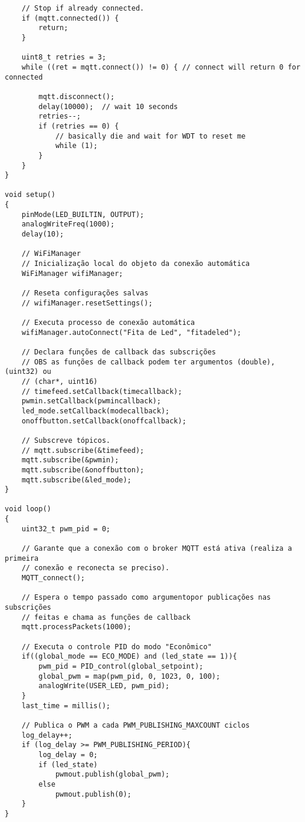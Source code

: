 \begin{lstlisting}
    // Stop if already connected.
    if (mqtt.connected()) {
        return;
    }

    uint8_t retries = 3;
    while ((ret = mqtt.connect()) != 0) { // connect will return 0 for connected

        mqtt.disconnect();
        delay(10000);  // wait 10 seconds
        retries--;
        if (retries == 0) {
            // basically die and wait for WDT to reset me
            while (1);
        }
    }
}

void setup() 
{
    pinMode(LED_BUILTIN, OUTPUT);
    analogWriteFreq(1000);
    delay(10);

    // WiFiManager
    // Inicialização local do objeto da conexão automática
    WiFiManager wifiManager;

    // Reseta configurações salvas
    // wifiManager.resetSettings();

    // Executa processo de conexão automática
    wifiManager.autoConnect("Fita de Led", "fitadeled");

    // Declara funções de callback das subscrições
    // OBS as funções de callback podem ter argumentos (double), (uint32) ou
    // (char*, uint16) 
    // timefeed.setCallback(timecallback);
    pwmin.setCallback(pwmincallback);
    led_mode.setCallback(modecallback);
    onoffbutton.setCallback(onoffcallback);

    // Subscreve tópicos.
    // mqtt.subscribe(&timefeed);
    mqtt.subscribe(&pwmin);
    mqtt.subscribe(&onoffbutton);
    mqtt.subscribe(&led_mode);
}

void loop() 
{
    uint32_t pwm_pid = 0; 
    
    // Garante que a conexão com o broker MQTT está ativa (realiza a primeira 
    // conexão e reconecta se preciso).
    MQTT_connect();

    // Espera o tempo passado como argumentopor publicações nas subscrições 
    // feitas e chama as funções de callback
    mqtt.processPackets(1000);

    // Executa o controle PID do modo "Econômico"
    if((global_mode == ECO_MODE) and (led_state == 1)){
        pwm_pid = PID_control(global_setpoint);
        global_pwm = map(pwm_pid, 0, 1023, 0, 100);
        analogWrite(USER_LED, pwm_pid);
    }
    last_time = millis();
    
    // Publica o PWM a cada PWM_PUBLISHING_MAXCOUNT ciclos
    log_delay++;
    if (log_delay >= PWM_PUBLISHING_PERIOD){
        log_delay = 0;
        if (led_state)
            pwmout.publish(global_pwm);
        else
            pwmout.publish(0);
    }
}

\end{lstlisting}

